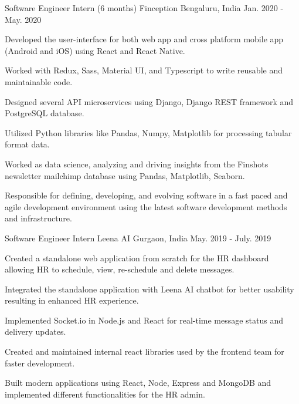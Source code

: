 

\begin{cventries}

  \cventry
    {Software Engineer Intern (6 months)} %
    {Finception} %
    {Bengaluru, India} %
    {Jan. 2020 - May. 2020} %
    {
      \begin{cvitems} %
        \item {Developed the user-interface for both web app and cross platform mobile app (Android and iOS) using React and React Native.}
        \item {Worked with Redux, Sass, Material UI, and Typescript to write reusable and maintainable code.}
        \item {Designed several API microservices using Django, Django REST framework and PostgreSQL database.}
        \item {Utilized Python libraries like Pandas, Numpy, Matplotlib for processing tabular format data.}
        \item {Worked as data science, analyzing and driving insights from the Finshots newsletter mailchimp database using Pandas, Matplotlib, Seaborn.}
        \item {Responsible for deﬁning, developing, and evolving software in a fast paced and agile development environment using the latest software development methods and infrastructure. }
      \end{cvitems}
    }

  \cventry
    {Software Engineer Intern} %
    {Leena AI} %
    {Gurgaon, India} %
    {May. 2019 - July. 2019} %
    {
      \begin{cvitems} %
        \item {Created a standalone web application from scratch for the HR dashboard allowing HR to schedule, view, re-schedule and delete messages.}
        \item {Integrated the standalone application with Leena AI chatbot for better usability resulting in enhanced HR experience.}
        \item {Implemented Socket.io in Node.js and React for real-time message status and delivery updates.}
        \item {Created and maintained internal react libraries used by the frontend team for faster development.}
        \item {Built modern applications using React, Node, Express and MongoDB and implemented different functionalities for the HR admin.}
      \end{cvitems}
    }


\end{cventries}
